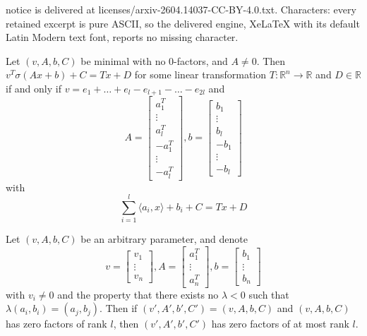 \documentclass[10pt,a4paper]{amsart}
\begin{document}
notice is delivered at licenses/arxiv-2604.14037-CC-BY-4.0.txt. Characters: every retained excerpt is pure ASCII, so the delivered engine, XeLaTeX with its default Latin Modern text font, reports no missing character.
\begin{proposition}\label{thm:nontrivialzeroparam}
    Let $(v, A, b, C)$ be minimal with no $0$-factors, and $A\neq 0$. Then $v^T\sigma (Ax+b) + C = Tx + D$ for some linear transformation $T:\mathbb{R}^n\rightarrow \mathbb{R}$ and $D\in\mathbb{R}$ if and only if $v = e_1 + \ldots + e_l - e_{l+1} - \ldots - e_{2l}$ and 
    $$
    A = \begin{bmatrix}
        a_1^T\\
        \vdots\\
        a_l^T\\
        -a_{1}^T\\
        \vdots\\
        -a_{l}^T
    \end{bmatrix}, b = \begin{bmatrix}
        b_1\\
        \vdots\\
        b_l\\
        -b_1\\
        \vdots\\
        -b_l
    \end{bmatrix}
    $$
    with
    $$
    \sum_{i=1}^l \langle a_i, x\rangle + b_i + C = Tx + D
    $$
\end{proposition}

\begin{corollary}\label{cor:minranklinind}
    Let $(v, A, b, C)$ be an arbitrary parameter, and denote
    $$
    v = \begin{bmatrix}
        v_1 \\ \vdots\\ v_n
    \end{bmatrix}, A = \begin{bmatrix}
        a_1^T\\ \vdots\\ a_n^T
    \end{bmatrix}, b = \begin{bmatrix}
        b_1 \\ \vdots\\ b_n
    \end{bmatrix}
    $$
    with $v_i\neq 0$ and the property that there exists no $\lambda<0$ such that $\lambda (a_i, b_i) = (a_j, b_j)$. Then if $(v', A', b', C')=(v, A, b, C)$ and $(v, A, b, C)$ has zero factors of rank $l$, then $(v', A', b', C')$ has zero factors of at most rank $l$. 
\end{corollary}
\end{document}
